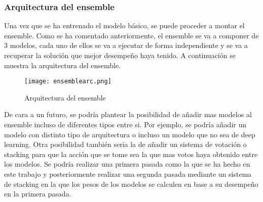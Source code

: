 \subsubsection{Arquitectura del ensemble}
Una vez que se ha entrenado el modelo básico, se puede proceder a montar el ensemble.
Como se ha comentado anteriormente, el ensemble se va a componer de 3 modelos, cada uno
de ellos se va a ejecutar de forma independiente y se va a recuperar la solución que 
mejor desempeño haya tenido. A continuación se muestra la arquitectura del ensemble.

\begin{figure}[ht]
    \centering
    \texttt{[image: ensemblearc.png]}
    \caption{Arquitectura del ensemble}
    \label{fig:ensemblearc}
\end{figure} 

De cara a un futuro, se podría plantear la posibilidad de añadir mas modelos al ensemble
incluso de diferentes tipos entre si. Por ejemplo, se podría añadir un modelo con 
distinto tipo de arquitectura o incluso un modelo que no sea de deep learning. Otra 
posibilidad también seria la de añadir un sistema de votación o stacking para que 
la acción que se tome sea la que mas votos haya obtenido entre los modelos. Se
podría realizar una primera pasada como la que se ha hecho en este trabajo y posteriormente
realizar una segunda pasada mediante un sistema de stacking en la que los pesos de los
modelos se calculen en base a su desempeño en la primera pasada.